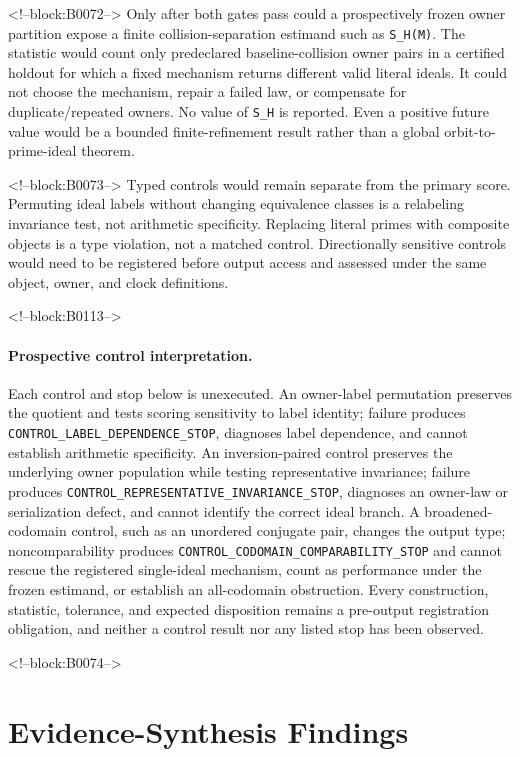 \documentclass[11pt,a4paper]{article}
\begin{document}
<!--block:B0072-->
Only after both gates pass could a prospectively frozen owner partition expose a finite collision-separation estimand such as \texttt{S\_H(M)}. The statistic would count only predeclared baseline-collision owner pairs in a certified holdout for which a fixed mechanism returns different valid literal ideals. It could not choose the mechanism, repair a failed law, or compensate for duplicate/repeated owners. No value of \texttt{S\_H} is reported. Even a positive future value would be a bounded finite-refinement result rather than a global orbit-to-prime-ideal theorem.

<!--block:B0073-->
Typed controls would remain separate from the primary score. Permuting ideal labels without changing equivalence classes is a relabeling invariance test, not arithmetic specificity. Replacing literal primes with composite objects is a type violation, not a matched control. Directionally sensitive controls would need to be registered before output access and assessed under the same object, owner, and clock definitions.

<!--block:B0113-->
\begingroup\sloppy
\paragraph{Prospective control interpretation.} Each control and stop below is unexecuted. An owner-label permutation preserves the quotient and tests scoring sensitivity to label identity; failure produces \texttt{CONTROL\_\allowbreak{}LABEL\_\allowbreak{}DEPENDENCE\_\allowbreak{}STOP}, diagnoses label dependence, and cannot establish arithmetic specificity. An inversion-paired control preserves the underlying owner population while testing representative invariance; failure produces \texttt{CONTROL\_REPRESENTATIVE\_INVARIANCE\_STOP}, diagnoses an owner-law or serialization defect, and cannot identify the correct ideal branch. A broadened-codomain control, such as an unordered conjugate pair, changes the output type; noncomparability produces \texttt{CONTROL\_CODOMAIN\_COMPARABILITY\_STOP} and cannot rescue the registered single-ideal mechanism, count as performance under the frozen estimand, or establish an all-codomain obstruction. Every construction, statistic, tolerance, and expected disposition remains a pre-output registration obligation, and neither a control result nor any listed stop has been observed.\par\endgroup

<!--block:B0074-->
\section{Evidence-Synthesis Findings}
\end{document}
